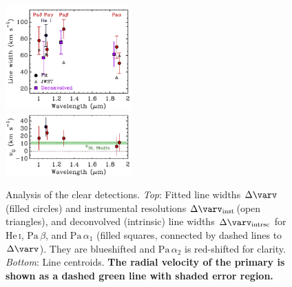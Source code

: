 \documentclass[twocolumn,twocolumnappendix]{aastex631}
\newcommand{\neuII}[1]{{\leavevmode{\boldmath\bfseries#1}}}
\renewcommand{\neuII}[1]{{\leavevmode#1}}
\newcommand{\neuIII}[1]{{\leavevmode\bfseries\neuII{#1}}}   %
\def\Paa{\ensuremath{\mathrm{Pa}\,\alpha}\xspace}           %
\def\Pab{\ensuremath{\mathrm{Pa}\,\beta}\xspace}            %
\def\HeI{\ensuremath{\mathrm{He}}\,\textsc{i}\xspace}       %
\def\HeIt{\HeI}                     %
\def\Dv{\ensuremath{\Delta \varv}\xspace}
\def\DvInst{\ensuremath{\Delta \varv_{\mathrm{inst}}}\xspace}
\def\Dvint{\ensuremath{\Delta \varv_{\mathrm{intrsc}}}\xspace}
\begin{document}
\begin{figure}[t]
 \centering
 \includegraphics[width=0.43\textwidth]{TWA27B_Deltav.pdf}\\
 \includegraphics[width=0.43\textwidth]{TWA27B_v0.pdf}  %
\caption{%
Analysis of the clear detections.
\textit{Top}:
Fitted line widths \Dv (filled circles) and instrumental resolutions \DvInst (open triangles), and deconvolved (intrinsic) line widths \Dvint for \HeIt, \Pab, and $\Paa_1$ (filled squares, connected by dashed lines to \Dv). They are blueshifted and $\Paa_2$ is red-shifted for clarity.
%
\textit{Bottom}:
Line centroids.
\neuIII{The radial velocity of the primary \citep{faherty16} is shown as a dashed green line with shaded error region.}%
}
\label{fig:Dv+v0}
\end{figure}
\end{document}
